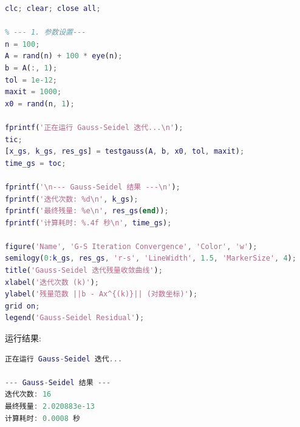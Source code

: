 \documentclass[11pt, a4paper]{article}
\begin{document}
\begin{lstlisting}[language=Matlab, caption={Gauss-Seidel迭代测试与绘图代码}]
clc; clear; close all;

% --- 1. 参数设置---
n = 100;
A = rand(n) + 100 * eye(n); 
b = A(:, 1);                
tol = 1e-12;
maxit = 1000;
x0 = rand(n, 1);

fprintf('正在运行 Gauss-Seidel 迭代...\n');
tic;
[x_gs, k_gs, res_gs] = testgauss(A, b, x0, tol, maxit);
time_gs = toc;

fprintf('\n--- Gauss-Seidel 结果 ---\n');
fprintf('迭代次数: %d\n', k_gs);
fprintf('最终残量: %e\n', res_gs(end));
fprintf('计算耗时: %.4f 秒\n', time_gs);

figure('Name', 'G-S Iteration Convergence', 'Color', 'w');
semilogy(0:k_gs, res_gs, 'r-s', 'LineWidth', 1.5, 'MarkerSize', 4);
title('Gauss-Seidel 迭代残量收敛曲线');
xlabel('迭代次数 (k)');
ylabel('残量范数 ||b - Ax^{(k)}|| (对数坐标)');
grid on;
legend('Gauss-Seidel Residual');
\end{lstlisting}
运行结果:
\begin{lstlisting}[language=Matlab, caption={Gauss-Seidel迭代测试结果}]
正在运行 Gauss-Seidel 迭代...

--- Gauss-Seidel 结果 ---
迭代次数: 16
最终残量: 2.020883e-13
计算耗时: 0.0008 秒
\end{lstlisting}
\end{document}
